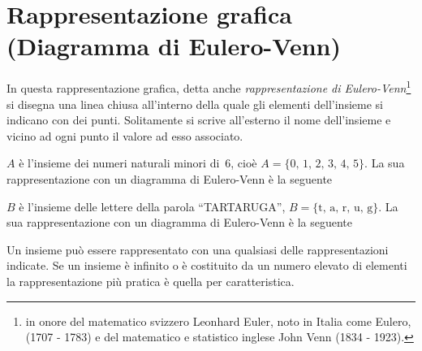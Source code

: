 \ovalbox{\risolvii \ref{ese:6.6}, \ref{ese:6.7}, \ref{ese:6.8}, \ref{ese:6.9}, \ref{ese:6.10}, \ref{ese:6.11}, \ref{ese:6.12}, \ref{ese:6.13}, \ref{ese:6.14}, \ref{ese:6.15},%
\ref{ese:6.16}, \ref{ese:6.17}, \ref{ese:6.18}, \ref{ese:6.19}}

\vspazio\ovalbox{\ref{ese:6.20}}

\section{Rappresentazione grafica (Diagramma di Eulero-Venn)}

In questa rappresentazione grafica, detta anche \textit{rappresentazione
di Eulero-Venn}\footnote{in onore del matematico svizzero Leonhard Euler, noto in Italia come Eulero, (1707 - 1783) e del matematico e statistico inglese John Venn (1834 - 1923).} si disegna una linea chiusa all'interno della quale gli elementi
dell'insieme si indicano con dei punti. Solitamente si scrive all'esterno il nome dell'insieme
e vicino ad ogni punto il valore ad esso associato.

\begin{exrig}
 \begin{esempio}
 $A$ è l'insieme dei numeri naturali minori di~6, cioè $A=\{\text{0, 1, 2, 3, 4, 5}\}$.
 La sua rappresentazione con un diagramma di Eulero-Venn è la seguente
 \begin{center}
  
 \end{center}

 \end{esempio}

 \begin{esempio}
 $B$ è l'insieme delle lettere della parola ``TARTARUGA'', $B=\{\text{t, a, r, u, g}\}$.
 La sua rappresentazione con un diagramma di Eulero-Venn è la seguente
 \begin{center}
  
 \end{center}

 \end{esempio}

\end{exrig}

Un insieme può essere rappresentato con una qualsiasi delle
rappresentazioni indicate. Se un insieme è infinito o è costituito
da un numero elevato di elementi la rappresentazione più pratica è
quella per caratteristica.

